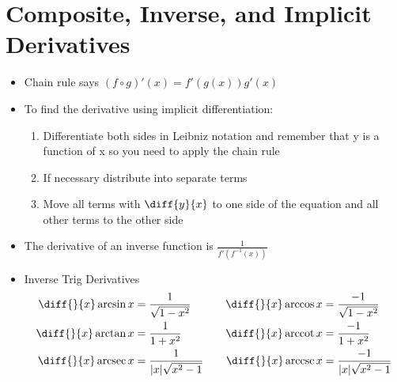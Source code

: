 \documentclass{article}
\DeclareMathOperator{\arcsec}{arcsec}
\DeclareMathOperator{\arccot}{arccot}
\DeclareMathOperator{\arccsc}{arccsc}
\begin{document}
\section{Composite, Inverse, and Implicit Derivatives}
\begin{itemize}
    \item Chain rule says $(f\circ g)'(x) = f'(g(x))g'(x)$
    \item To find the derivative using implicit differentiation:
    \begin{enumerate}
        \item Differentiate both sides in Leibniz notation and remember that y is a function of x so you need to apply the chain rule
        \item If necessary distribute into separate terms
        \item Move all terms with $\diff{y}{x}$ to one side of the equation and all other terms to the other side
    \end{enumerate}
    \item The derivative of an inverse function is $\frac{1}{f'(f^{-1}(x))}$
    \item Inverse Trig Derivatives
        \begin{equation*}
            \begin{aligned}[c]
            \diff{}{x} \arcsin x &= \frac{1}{\sqrt{1-x^2}} \\
            \diff{}{x} \arctan x &= \frac{1}{1+x^2} \\
            \diff{}{x} \arcsec x &= \frac{1}{|x|\sqrt{x^2-1}}
            \end{aligned}
            \qquad
            \begin{aligned}[c]
            \diff{}{x} \arccos x &= \frac{-1}{\sqrt{1-x^2}} \\
            \diff{}{x} \arccot x &= \frac{-1}{1+x^2} \\
            \diff{}{x} \arccsc x &= \frac{-1}{|x|\sqrt{x^2-1}}
            \end{aligned}
        \end{equation*}
\end{itemize}

\newpage
\end{document}
